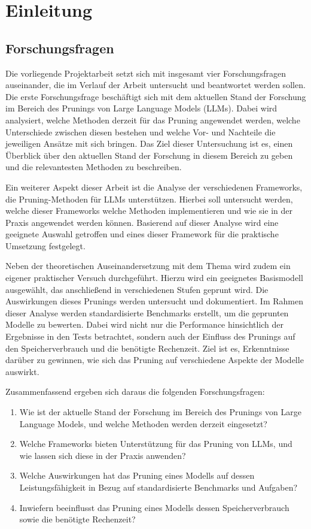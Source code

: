 \section{Einleitung}


\subsection{Forschungsfragen}

Die vorliegende Projektarbeit setzt sich mit insgesamt vier Forschungsfragen
auseinander, die im Verlauf der Arbeit untersucht und beantwortet werden sollen.
Die erste Forschungsfrage beschäftigt sich mit dem aktuellen Stand der Forschung
im Bereich des Prunings von Large Language Models (LLMs). Dabei wird analysiert,
welche Methoden derzeit für das Pruning angewendet werden, welche Unterschiede
zwischen diesen bestehen und welche Vor- und Nachteile die jeweiligen Ansätze
mit sich bringen. Das Ziel dieser Untersuchung ist es, einen Überblick über den
aktuellen Stand der Forschung in diesem Bereich zu geben und die relevantesten
Methoden zu beschreiben.

Ein weiterer Aspekt dieser Arbeit ist die Analyse der verschiedenen Frameworks,
die Pruning-Methoden für LLMs unterstützen. Hierbei soll untersucht werden,
welche dieser Frameworks welche Methoden implementieren und wie sie in der
Praxis angewendet werden können. Basierend auf dieser Analyse wird eine
geeignete Auswahl getroffen und eines dieser Framework für die praktische
Umsetzung festgelegt.

Neben der theoretischen Auseinandersetzung mit dem Thema wird zudem ein eigener
praktischer Versuch durchgeführt. Hierzu wird ein geeignetes Basismodell
ausgewählt, das anschließend in verschiedenen Stufen geprunt wird. Die
Auswirkungen dieses Prunings werden untersucht und dokumentiert. Im Rahmen
dieser Analyse werden standardisierte Benchmarks erstellt, um die geprunten
Modelle zu bewerten. Dabei wird nicht nur die Performance hinsichtlich der
Ergebnisse in den Tests betrachtet, sondern auch der Einfluss des Prunings auf
den Speicherverbrauch und die benötigte Rechenzeit. Ziel ist es, Erkenntnisse
darüber zu gewinnen, wie sich das Pruning auf verschiedene Aspekte der Modelle
auswirkt.

Zusammenfassend ergeben sich daraus die folgenden Forschungsfragen:

\begin{enumerate}
	\item Wie ist der aktuelle Stand der Forschung im Bereich des
	      Prunings von Large Language Models, und welche Methoden werden derzeit
	      eingesetzt?
	\item Welche Frameworks bieten Unterstützung für das Pruning von
	      LLMs, und wie lassen sich diese in der Praxis anwenden?
	\item Welche
	      Auswirkungen hat das Pruning eines Modells auf dessen Leistungsfähigkeit in
	      Bezug auf standardisierte Benchmarks und Aufgaben?
	\item Inwiefern
	      beeinflusst das Pruning eines Modells dessen Speicherverbrauch sowie die
	      benötigte Rechenzeit?
\end{enumerate}
